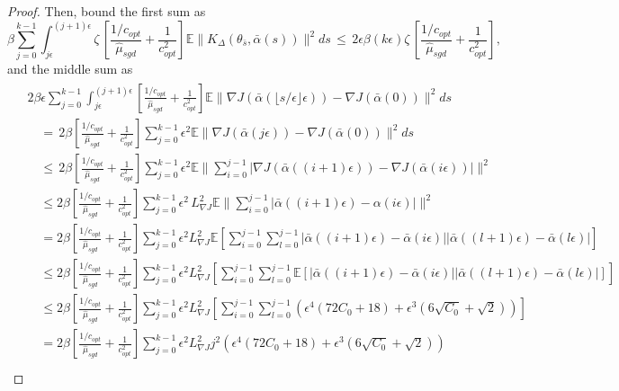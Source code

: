 \documentclass[journal,onecolumn]{IEEEtran}
\newcommand{\step}{\epsilon}
\newcommand{\grad}{\nabla}
\newcommand{\rew}{J}
\newcommand{\CE}{\mathbb{E}}
\newcommand{\alsbar}{\bar{\alpha}(s)}
\newcommand{\sbar}{\bar{s}}
\newcommand{\K}{K}
\newcommand{\Kd}{\K_{\Delta}}
\newcommand{\alsebar}{\bar{\alpha}(\lfloor s / \step \rfloor \step)}
\newcommand{\gradnvar}{\zeta}
\newcommand{\lipGJ}{L_{\grad\rew}}
\newcommand{\sgdtm}{c_{opt}}
\begin{document}
{\begin{proof}
{Then, bound the first sum as 
\begin{equation}
\label{bd:fs}
    \beta \sum_{j=0}^{k-1} \int _{j\step}^{(j+1)\step}  \gradnvar\,\left[\frac{1/\sgdtm}{\hat{\mu}_{sgd}} + \frac{1}{\sgdtm^2} \right] \CE\|\Kd(\theta_{\sbar},\alsbar) \|^2 ds \, \leq \, 2\step \beta (k\step)\gradnvar\,\left[\frac{1/\sgdtm}{\hat{\mu}_{sgd}} + \frac{1}{\sgdtm^2} \right],
\end{equation}
and the middle sum as 
\begin{align}
\begin{split}
\label{eq:bd2}
&2\beta\step \sum_{j=0}^{k-1} \int_{j\step}^{(j+1)\step}\left[\frac{1/\sgdtm}{\hat{\mu}_{sgd}} + \frac{1}{\sgdtm^2} \right] \CE \| \grad\rew(\alsebar) - \grad\rew(\bar{\alpha}(0))\|^2 ds \\
& \quad = \, 2\beta \left[\frac{1/\sgdtm}{\hat{\mu}_{sgd}} + \frac{1}{\sgdtm^2} \right] \sum_{j=0}^{k-1} \step^2 \CE \| \grad\rew(\bar{\alpha}(j\step)) - \grad\rew(\bar{\alpha}(0))\|^2 ds \\
& \quad \leq \, 2\beta \left[\frac{1/\sgdtm}{\hat{\mu}_{sgd}} + \frac{1}{\sgdtm^2} \right]\sum_{j=0}^{k-1} \step^2 \CE \| \sum_{i=0}^{j-1}|\grad\rew(\bar{\alpha}((i+1)\step)) - \grad\rew(\bar{\alpha}(i\step))|\|^2 \\
& \quad \leq 2\beta \left[\frac{1/\sgdtm}{\hat{\mu}_{sgd}} + \frac{1}{\sgdtm^2} \right] \sum_{j=0}^{k-1} \step^2 \, \lipGJ^2 \CE \| \sum_{i=0}^{j-1}|\bar{\alpha}((i+1)\step) - \alpha(i\step)|\|^2 \\
& \quad = 2\beta \left[\frac{1/\sgdtm}{\hat{\mu}_{sgd}} + \frac{1}{\sgdtm^2} \right] \sum_{j=0}^{k-1}\step^2 \lipGJ^2\CE\left[\sum_{i=0}^{j-1}\sum_{l=0}^{j-1}|\bar{\alpha}((i+1)\step) - \bar{\alpha}(i\step)||\bar{\alpha}((l+1)\step) - \bar{\alpha}(l\step)| \right] \\
&\quad \leq 2\beta\left[\frac{1/\sgdtm}{\hat{\mu}_{sgd}} + \frac{1}{\sgdtm^2} \right] \sum_{j=0}^{k-1}\step^2 \lipGJ^2 \left[\sum_{i=0}^{j-1}\sum_{l=0}^{j-1} \CE\left[|\bar{\alpha}((i+1)\step) - \bar{\alpha}(i\step)||\bar{\alpha}((l+1)\step) - \bar{\alpha}(l\step)|\right] \right]\\
&\quad \leq 2\beta \left[\frac{1/\sgdtm}{\hat{\mu}_{sgd}} + \frac{1}{\sgdtm^2} \right] \sum_{j=0}^{k-1}\step^2 \lipGJ^2 \left[\sum_{i=0}^{j-1}\sum_{l=0}^{j-1} \left(\step^4\left(72C_0+ 18\right) + \step^3\left(6\sqrt{C_0} +\sqrt{2}\right)\right)\right] \\
& \quad = 2\beta \left[\frac{1/\sgdtm}{\hat{\mu}_{sgd}} + \frac{1}{\sgdtm^2} \right] \sum_{j=0}^{k-1}\step^2 \lipGJ^2 j^2 \left(\step^4\left(72C_0+ 18\right) + \step^3\left(6\sqrt{C_0} +\sqrt{2}\right)\right) \\

\end{split}
\end{align}}
\end{proof}}
\end{document}
